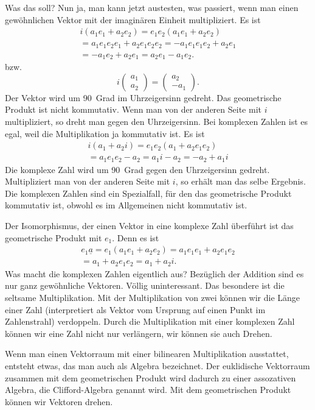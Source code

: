 \documentclass[a4paper,10pt,fleqn,twocolumn,twoside]{article}
\begin{document}
Was das soll? Nun ja, man kann jetzt austesten, was passiert,
wenn man einen gewöhnlichen Vektor mit der imaginären Einheit
multipliziert. Es ist
\begin{gather*}
i(a_1e_1+a_2e_2) = e_1e_2(a_1e_1+a_2e_2)\\
= a_1e_1e_2e_1+a_2e_1e_2e_2 = -a_1e_1e_1e_2+a_2e_1\\
= -a_1e_2+a_2e_1 = a_2e_1-a_1e_2.
\end{gather*}
\noindent
bzw.
\[i\begin{pmatrix}a_1\\ a_2\end{pmatrix}
= \begin{pmatrix}a_2\\ -a_1\end{pmatrix}.\]
\noindent
Der Vektor wird um 90~Grad im Uhrzeigersinn gedreht. Das geometrische
Produkt ist nicht kommutativ. Wenn man von der anderen Seite mit \(i\)
multipliziert, so dreht man gegen den Uhrzeigersinn. Bei komplexen
Zahlen ist es egal, weil die Multiplikation ja kommutativ ist. Es ist
\begin{gather*}
i(a_1+a_2i) = e_1e_2(a_1+a_2e_1e_2)\\
= a_1e_1e_2-a_2 = a_1i-a_2 = -a_2+a_1i
\end{gather*}
\noindent
Die komplexe Zahl wird um 90~Grad gegen den Uhrzeigersinn gedreht.
Multipliziert man von der anderen Seite mit \(i\), so erhält man das
selbe Ergebnis. Die komplexen Zahlen sind ein Spezialfall, für den
das geometrische Produkt kommutativ ist, obwohl es im Allgemeinen
nicht kommutativ ist.

Der Isomorphismus, der einen Vektor in eine komplexe Zahl überführt
ist das geometrische Produkt mit \(e_1\). Denn es ist
\begin{gather*}
e_1\underline a = e_1(a_1e_1+a_2e_2) = a_1e_1e_1 + a_2e_1e_2\\
= a_1 + a_2e_1e_2 = a_1+a_2i.
\end{gather*}
\noindent
Was macht die komplexen Zahlen eigentlich aus? Bezüglich der Addition
sind es nur ganz gewöhnliche Vektoren. Völlig uninteressant.
Das besondere ist die seltsame Multiplikation. Mit der Multiplikation
von zwei können wir die Länge einer Zahl (interpretiert als Vektor vom
Ursprung auf einen Punkt im Zahlenstrahl) verdoppeln. Durch die Multiplikation
mit einer komplexen Zahl können wir eine Zahl nicht nur verlängern,
wir können sie auch Drehen.

Wenn man einen Vektorraum mit einer bilinearen Multiplikation
ausstattet, entsteht etwas, das man auch als Algebra bezeichnet.
Der euklidische Vektorraum zusammen mit dem geometrischen Produkt
wird dadurch zu einer assozativen Algebra, die Clifford-Algebra
genannt wird. Mit dem geometrischen Produkt können wir Vektoren
drehen.
\end{document}
